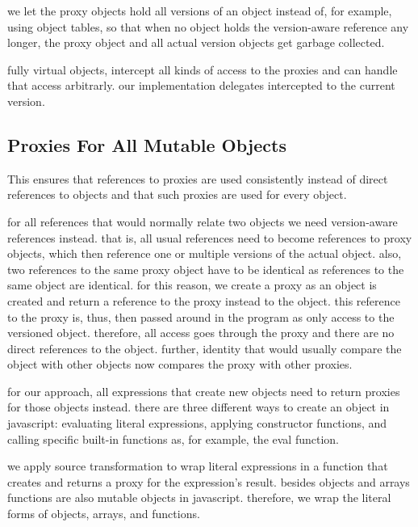 we let the proxy objects hold all versions of an object instead of, for example, using object tables, so that when no object holds the version-aware reference any longer, the proxy object and all actual version objects get garbage collected.

fully virtual objects, intercept all kinds of access to the proxies and can handle that access arbitrarly.
our implementation delegates intercepted to the current version.



\subsection{Proxies For All Mutable Objects}

This ensures that references to proxies are used consistently instead of direct references to objects and that such proxies are used for every object.

for all references that would normally relate two objects we need version-aware references instead.
that is, all usual references need to become references to proxy objects, which then reference one or multiple versions of the actual object.
also, two references to the same proxy object have to be identical as references to the same object are identical.
for this reason, we create a proxy as an object is created and return a reference to the proxy instead to the object.
this reference to the proxy is, thus, then passed around in the program as only access to the versioned object.
therefore, all access goes through the proxy and there are no direct references to the object.
further, identity that would usually compare the object with other objects now compares the proxy with other proxies.

for our approach, all expressions that create new objects need to return proxies for those objects instead.
there are three different ways to create an object in javascript: evaluating literal expressions, applying constructor functions, and calling specific built-in functions as, for example, the eval function.

we apply source transformation to wrap literal expressions in a function that creates and returns a proxy for the expression's result.
besides objects and arrays functions are also mutable objects in javascript.
therefore, we wrap the literal forms of objects, arrays, and functions.

